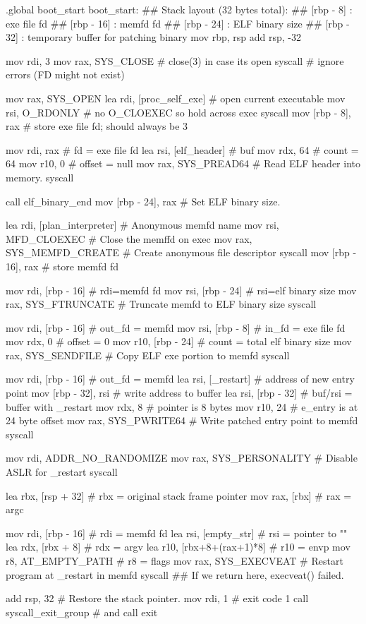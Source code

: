 \begin{asm}
.global boot_start
boot_start:
	## Stack layout (32 bytes total):
	##    [rbp - 8]   : exe file fd
	##    [rbp - 16]  : memfd fd
	##    [rbp - 24]  : ELF binary size
	##    [rbp - 32]  : temporary buffer for patching binary
	mov	rbp, rsp
	add	rsp, -32

	mov	rdi, 3
	mov	rax, SYS_CLOSE		# close(3) in case its open
	syscall				# ignore errors (FD might not exist)

	mov	rax, SYS_OPEN
	lea	rdi, [proc_self_exe]	# open current executable
	mov	rsi, O_RDONLY		# no O_CLOEXEC so hold across exec
	syscall
	mov	[rbp - 8], rax		# store exe file fd; should always be 3

	mov	rdi, rax     	 	# fd = exe file fd
	lea	rsi, [elf_header]	# buf
	mov	rdx, 64			# count = 64
	mov	r10, 0			# offset = null
	mov	rax, SYS_PREAD64	# Read ELF header into memory.
	syscall

	call	elf_binary_end
	mov	[rbp - 24], rax		# Set ELF binary size.

	lea	rdi, [plan_interpreter] # Anonymous memfd name
	mov	rsi, MFD_CLOEXEC	# Close the memffd on exec
	mov	rax, SYS_MEMFD_CREATE	# Create anonymous file descriptor
	syscall
	mov	[rbp - 16], rax		# store memfd fd

	mov	rdi, [rbp - 16]	 	# rdi=memfd fd
	mov	rsi, [rbp - 24]		# rsi=elf binary size
	mov	rax, SYS_FTRUNCATE	# Truncate memfd to ELF binary size
	syscall

	mov	rdi, [rbp - 16]		# out_fd = memfd
	mov	rsi, [rbp - 8]		# in_fd = exe file fd
	mov	rdx, 0	    		# offset = 0
	mov	r10, [rbp - 24]		# count = total elf binary size
	mov	rax, SYS_SENDFILE	# Copy ELF exe portion to memfd
	syscall

	mov	rdi, [rbp - 16]	  	# out_fd = memfd
	lea	rsi, [_restart]		# address of new entry point
	mov	[rbp - 32], rsi		# write address to buffer
	lea	rsi, [rbp - 32]		# buf/rsi = buffer with _restart
	mov	rdx, 8			# pointer is 8 bytes
	mov	r10, 24			# e_entry is at 24 byte offset
	mov	rax, SYS_PWRITE64	# Write patched entry point to memfd
	syscall

	mov	rdi, ADDR_NO_RANDOMIZE
	mov	rax, SYS_PERSONALITY	# Disable ASLR for _restart
	syscall

	lea	rbx, [rsp + 32]		# rbx = original stack frame pointer
	mov	rax, [rbx]  		# rax = argc

	mov	rdi, [rbp - 16]		# rdi = memfd fd
	lea	rsi, [empty_str]	# rsi = pointer to ""
	lea	rdx, [rbx + 8]		# rdx = argv
	lea	r10, [rbx+8+(rax+1)*8]  # r10 = envp
	mov	r8, AT_EMPTY_PATH	# r8 = flags
	mov	rax, SYS_EXECVEAT	# Restart program at _restart in memfd
	syscall
	## If we return here, execveat() failed.

	add	rsp, 32			# Restore the stack pointer.
	mov	rdi, 1			# exit code 1
	call	syscall_exit_group      # and call exit
\end{asm}


